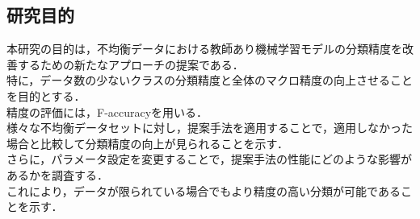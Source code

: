 \subsection*{研究目的}

本研究の目的は，不均衡データにおける教師あり機械学習モデルの分類精度を改善するための新たなアプローチの提案である．\\
特に，データ数の少ないクラスの分類精度と全体のマクロ精度の向上させることを目的とする．\\
精度の評価には，F-accuracyを用いる．\\
様々な不均衡データセットに対し，提案手法を適用することで，適用しなかった場合と比較して分類精度の向上が見られることを示す．\\
さらに，パラメータ設定を変更することで，提案手法の性能にどのような影響があるかを調査する．\\
これにより，データが限られている場合でもより精度の高い分類が可能であることを示す．\\
